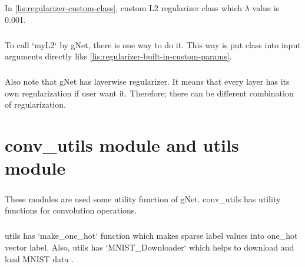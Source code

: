 \documentclass[12pt]{report}
\begin{document}
In \ref{lis:regularizer-custom-class}, custom L2 regularizer class which $\lambda$ value is 0.001.

\paragraph{}
To call `myL2` by gNet, there is one way to do it. This way is put class into input arguments directly like
\ref{lis:regularizer-built-in-custom-params}.

\paragraph{}
Also note that gNet has layerwise regularizer. It means that every layer has its own regularization if user want it. Therefore; there can be different combination of regularization.





\chapter{conv\_utils module and utils module}

\paragraph{}
These modules are used some utility function of gNet. conv\_utils has utility functions for convolution operations.

\paragraph{}
utils has `make\_one\_hot` function which makes sparse label values into one\_hot vector label. Also, utils has `MNIST\_Downloader` which helps to download and load MNIST data \cite{MNIST}.









\end{document}
